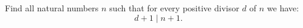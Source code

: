 Find all natural numbers $n$ such that for every positive divisor $d$ of $n$ we have:
$$d+1 \mid n+1.$$
